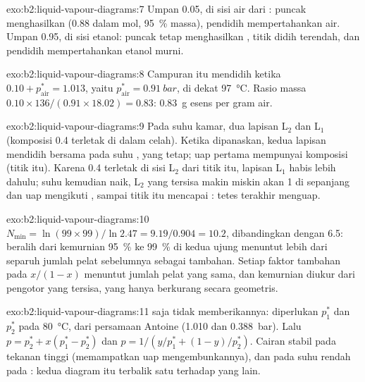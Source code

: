 \begin{solution}{exo:b2:liquid-vapour-diagrams:7}
Umpan 0.05, di sisi air dari : puncak menghasilkan  (0.88
dalam mol, 95~\% massa), pendidih mempertahankan air. Umpan 0.95, di sisi
etanol: puncak tetap menghasilkan , titik didih terendah, dan
pendidih mempertahankan etanol murni.
\end{solution}

\begin{solution}{exo:b2:liquid-vapour-diagrams:8}
Campuran itu mendidih ketika $0.10 + p^*_{\text{air}} = 1.013$, yaitu
$p^*_{\text{air}} = \qty{0.91}{bar}$, di dekat \qty{97}{\degreeCelsius}.
Rasio massa $0.10 \times 136/(0.91 \times 18.02) = 0.83$: \qty{0.83}{g}
esens per gram air.
\end{solution}

\begin{solution}{exo:b2:liquid-vapour-diagrams:9}
Pada suhu kamar, dua lapisan L$_2$ dan L$_1$ (komposisi 0.4 terletak di
dalam celah). Ketika dipanaskan, kedua lapisan mendidih bersama pada suhu
, yang tetap; uap pertama mempunyai komposisi 
(titik itu). Karena 0.4 terletak di sisi L$_2$ dari titik itu, lapisan
L$_1$ habis lebih dahulu; suhu kemudian naik, L$_2$ yang tersisa makin
miskin akan 1 di sepanjang  dan uap mengikuti , sampai titik itu mencapai : tetes terakhir menguap.
\end{solution}

\begin{solution}{exo:b2:liquid-vapour-diagrams:10}
$N_{\min} = \ln(99 \times 99)/\ln 2.47 = 9.19/0.904 = 10.2$, dibandingkan
dengan 6.5: beralih dari kemurnian 95~\% ke 99~\% di kedua ujung menuntut
lebih dari separuh jumlah pelat sebelumnya sebagai tambahan. Setiap faktor
tambahan pada $x/(1 - x)$ menuntut jumlah pelat yang sama, dan kemurnian
diukur dari pengotor yang tersisa, yang hanya berkurang secara geometris.
\end{solution}

\begin{solution}{exo:b2:liquid-vapour-diagrams:11}
 saja tidak memberikannya: diperlukan $p_1^*$ dan $p_2^*$
pada \qty{80}{\degreeCelsius}, dari persamaan Antoine (1.010 dan
\qty{0.388}{bar}). Lalu $p = p_2^* + x(p_1^* - p_2^*)$ dan
$p = 1/(y/p_1^* + (1 -
y)/p_2^*)$. Cairan stabil pada tekanan tinggi
(memampatkan uap mengembunkannya), dan pada suhu rendah pada : kedua diagram itu terbalik satu terhadap yang lain.
\end{solution}

